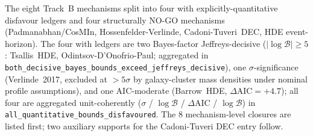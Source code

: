 \documentclass[aps,prd,reprint,nofootinbib,superscriptaddress]{revtex4-2}
\begin{document}
The eight Track~B mechanisms split into four with explicitly-quantitative
disfavour ledgers and four structurally NO-GO mechanisms
(Padmanabhan/CosMIn, Hossenfelder-Verlinde, Cadoni-Tuveri~DEC, HDE
event-horizon). The four with ledgers are two Bayes-factor
Jeffreys-decisive ($|\!\log\mathcal{B}| \geq 5$: Tsallis~HDE,
Odintsov-D'Onofrio-Paul; aggregated in
\texttt{both\_decisive\_bayes\_bounds\_exceed\_jeffreys\_decisive}), one
$\sigma$-significance (Verlinde~2017, excluded at $>5\sigma$ by
galaxy-cluster mass densities under nominal profile assumptions), and one
AIC-moderate (Barrow~HDE, $\Delta\!\text{AIC} = +4.7$); all four are
aggregated unit-coherently
($\sigma$ / $\log\mathcal{B}$ / $\Delta\!\text{AIC}$ / $\log\mathcal{B}$)
in \texttt{all\_quantitative\_bounds\_disfavoured}. The 8 mechanism-level
closures are listed first; two auxiliary supports for the Cadoni-Tuveri
DEC entry follow.
\end{document}
